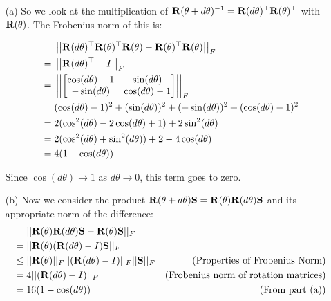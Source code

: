 \documentclass[english]{article}
\begin{document}
\begin{enumerate}

\item[(a)] So we look at the multiplication of ${\bf R}(\theta + d\theta)^{-1} = {\bf R}(d\theta)^\top{\bf R}(\theta)^\top$ with ${\bf R}(\theta)$. The Frobenius norm of this is:

\begin{align*}
&\; \left| \left| {\bf R}(d\theta)^\top{\bf R}(\theta)^\top {\bf R}(\theta) - {\bf R}(\theta)^\top {\bf R}(\theta) \right| \right|_F \\
=&\; \left| \left| {\bf R}(d\theta)^\top - I \right| \right|_F  \\
=&\; \left| \left| \begin{bmatrix}
			\cos(d\theta) - 1 & \sin(d\theta) \\
			-\sin(d\theta) & \cos(d\theta) - 1
		\end{bmatrix} \right| \right|_F \\
=&\; (\cos(d\theta) - 1)^2 + (\sin(d\theta))^2 + (-\sin(d\theta))^2 + (\cos(d\theta) - 1)^2 \\
=&\; 2(\cos^2(d\theta) - 2\cos(d\theta) + 1) + 2\sin^2(d\theta) \\
=&\; 2(\cos^2(d\theta) + \sin^2(d\theta)) + 2 - 4\cos(d\theta) \\
=&\; 4(1 - \cos(d\theta))
\end{align*}

Since $\cos(d\theta) \rightarrow 1$ as $d\theta \rightarrow 0$, this term goes to zero.

\item[(b)] Now we consider the product ${\bf R}(\theta + d\theta) {\bf S} = {\bf R}(\theta) {\bf R}(d\theta) {\bf S}$ and its appropriate norm of the difference:
\begin{align*}
    &\; ||{\bf R}(\theta) {\bf R}(d\theta) {\bf S} - {\bf R}(\theta) {\bf S}||_F \\
  = &\; ||{\bf R}(\theta)({\bf R}(d\theta) - I) {\bf S}||_F \\
\le &\; ||{\bf R}(\theta)||_F ||({\bf R}(d\theta) - I)||_F ||{\bf S}||_F & \textrm{(Properties of Frobenius Norm)} \\
  = &\; 4 ||({\bf R}(d\theta) - I)||_F  & \textrm{(Frobenius norm of rotation matrices)} \\
  = &\; 16 (1 - \cos(d\theta))  & \textrm{(From part (a))} \\
\end{align*}


\end{enumerate}
\end{document}
